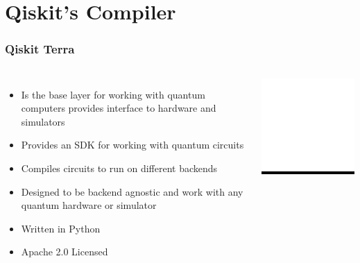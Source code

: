 \documentclass[aspectratio=169,11pt,hyperref={colorlinks=true}]{beamer}
\begin{document}
\section{Qiskit's Compiler}
\begin{frame}
    \frametitle{Qiskit Terra\footnotemark[1]}
    \begin{columns}
             \begin{itemize}
                  \item Is the base layer for working with quantum computers provides interface to hardware and simulators
                  \item Provides an SDK for working with quantum circuits
                  \item Compiles circuits to run on different backends
                  \item Designed to be backend agnostic and work with any
                      quantum hardware or simulator
                  \item Written in Python
                  \item Apache 2.0 Licensed
             \end{itemize}
              \centering
              \colorbox{black}{\includegraphics[width=.5\textwidth]{qiskit-terra-logo.png}}
      \end{columns}
  \end{frame}
\end{document}
